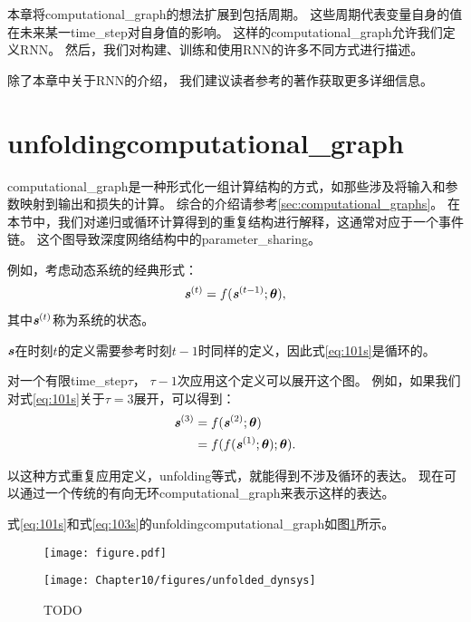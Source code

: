 本章将\gls{computational_graph}的想法扩展到包括周期。
这些周期代表变量自身的值在未来某一\gls{time_step}对自身值的影响。
这样的\gls{computational_graph}允许我们定义\gls{RNN}。
然后，我们对构建、训练和使用\gls{RNN}的许多不同方式进行描述。



除了本章中关于\gls{RNN}的介绍， 我们建议读者参考\cite{Graves-book2012}的著作获取更多详细信息。


\section{\gls{unfolding}\gls{computational_graph}}
\label{sec:unfolding_computational_graphs}
\gls{computational_graph}是一种形式化一组计算结构的方式，如那些涉及将输入和参数映射到输出和损失的计算。
综合的介绍请参考\ref{sec:computational_graphs}。
在本节中，我们对递归或循环计算得到的重复结构进行解释，这通常对应于一个事件链。
这个图导致深度网络结构中的\gls{parameter_sharing}。



例如，考虑动态系统的经典形式：
\begin{align}
\label{eq:101s}
\boldsymbol{\mathit{s}}^{(t)} = f(\boldsymbol{\mathit{s}}^{(t-1)}; \boldsymbol{\theta}),
\end{align}
其中$ \boldsymbol{\mathit{s}}^{(t)}$称为系统的状态。



$\boldsymbol{\mathit{s}}$在时刻$t$的定义需要参考时刻$t-1$时同样的定义，因此式\eqref{eq:101s}是循环的。



对一个有限\gls{time_step}$\tau$， $\tau-1$次应用这个定义可以展开这个图。
例如，如果我们对式\eqref{eq:101s}关于$\tau = 3$展开，可以得到：
\begin{align}
 \boldsymbol{\mathit{s}}^{(3)} &= f(\boldsymbol{\mathit{s}}^{(2)}; \boldsymbol{\theta}) \\
 & = f(f(\boldsymbol{\mathit{s}}^{(1)}; \boldsymbol{\theta}) ; \boldsymbol{\theta}).
  \label{eq:103s}
\end{align}



以这种方式重复应用定义，\gls{unfolding}等式，就能得到不涉及循环的表达。
现在可以通过一个传统的有向无环\gls{computational_graph}来表示这样的表达。



式\eqref{eq:101s}和式\eqref{eq:103s}的\gls{unfolding}\gls{computational_graph}如图\ref{fig:chap10_unfolded_dynsys}所示。
\begin{figure}[!htb]
\ifOpenSource
\centerline{\texttt{[image: figure.pdf]}}
\else
\centerline{\texttt{[image: Chapter10/figures/unfolded\_dynsys]}}
\fi
\caption{TODO}
\label{fig:chap10_unfolded_dynsys}
\end{figure}


